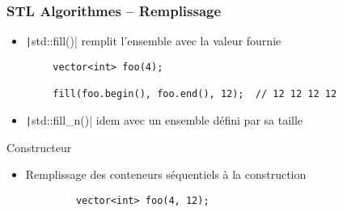 \documentclass[C++.tex]{subfiles}
\begin{document}
\begin{frame}[fragile]
	\frametitle{STL Algorithmes -- Remplissage}
	\begin{itemize}
		\item \texttt|std::fill()| remplit l'ensemble avec la valeur fournie
	\end{itemize}

	\begin{verbatim}
		vector<int> foo(4);

		fill(foo.begin(), foo.end(), 12);  // 12 12 12 12
	\end{verbatim}

	\begin{itemize}
		\item \texttt|std::fill_n()| idem avec un ensemble défini par sa taille
	\end{itemize}

	\begin{block}{Constructeur}
		\begin{itemize}
			\item Remplissage des conteneurs séquentiels à la construction
		\end{itemize}

		\begin{verbatim}
			vector<int> foo(4, 12);
		\end{verbatim}
	\end{block}
\end{frame}
\end{document}
